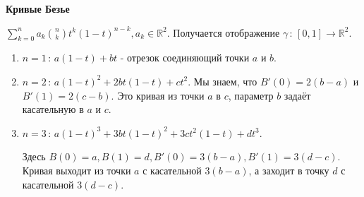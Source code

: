 \textbf{Кривые Безье}

$\sum_{k = 0}^n a_k \binom{n}{k} t^k (1 - t)^{n - k}, a_k \in \mathbb{R}^2$. Получается 
отображение $\gamma \, : \, [0, 1] \to \mathbb{R}^2$.

\begin{enumerate}
    \item {
        $n = 1 \, : \, a(1 - t) + bt$ - отрезок соединяющий точки $a$ и $b$.
    }
    \item {
        $n = 2 \, : \, a(1 - t)^2 + 2bt(1 - t) + ct^2$. Мы знаем, что $B'(0) = 2(b - a)$ и $B'(1) = 2(c - b)$.
        Это кривая из точки $a$ в $c$, параметр $b$ задаёт касательную в $a$ и $c$.
    }
    \item {
        $n = 3 \, : \, a(1 - t)^3 + 3bt(1-t)^2 + 3ct^2(1 - t) + dt^3$.

        Здесь $B(0) = a, B(1) = d, B'(0) = 3(b - a), B'(1) = 3(d - c)$. Кривая выходит
        из точки $a$ с касательной $3(b - a)$, а заходит в точку $d$ с касательной $3(d - c)$.
    }
\end{enumerate}
